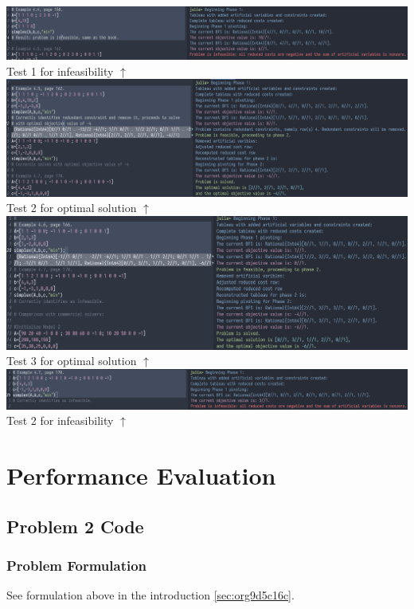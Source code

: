 \documentclass[11pt]{article}
\begin{document}
\begin{center}
\includegraphics[width=\textwidth]{figure4.png}\\
Test 1 for infeasibility $\uparrow$\\

\includegraphics[width=\textwidth]{figure5.png}\\
Test 2 for optimal solution $\uparrow$\\

\includegraphics[width=\textwidth]{figure6.png}\\
Test 3 for optimal solution $\uparrow$\\

\includegraphics[width=\textwidth]{figure7.png}\\
Test 2 for infeasibility $\uparrow$
\end{center}
\section{Performance Evaluation}
\label{sec:org26e9204}
\subsection{Problem 2 Code}
\label{sec:org528cab0}
\subsubsection{Problem Formulation}
\label{sec:org761ff96}
See formulation above in the introduction \ref{sec:org9d5c16c}.
\end{document}

